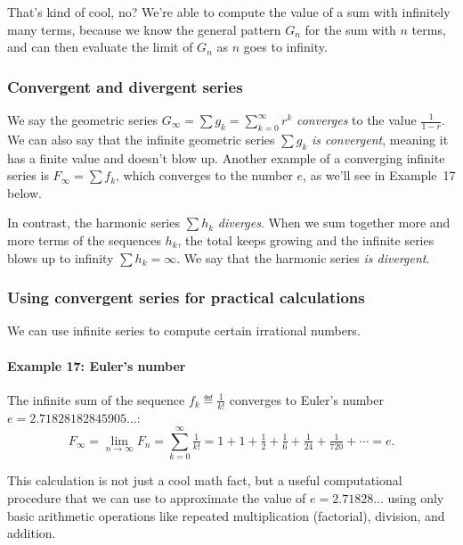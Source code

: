 		\noindent
		That's kind of cool, no?
		We're able to compute the value of a sum with infinitely many terms,
		because we know the general pattern $G_n$ for the sum with $n$ terms,
		and can then evaluate the limit of $G_n$ as $n$ goes to infinity.


		\subsubsection{Convergent and divergent series}
	
			We say the geometric series $G_\infty = \sum g_k = \sum_{k=0}^\infty r^k$ \emph{converges}
			to the value $\frac{1}{1-r}$.
			We can also say that the infinite geometric series $\sum g_k$ \emph{is convergent},
			meaning it has a finite value and doesn't blow up.
			Another example of a converging infinite series is $F_\infty = \sum f_k$,
			which converges to the number $e$,
			as we'll see in Example~17 below.
	
			In contrast,
			the harmonic series $\sum h_k$ \emph{diverges}.
			When we sum together more and more terms of the sequences $h_k$,
			the total keeps growing and the infinite series blows up to infinity
			$\sum h_k = \infty$.
			We say that the harmonic series \emph{is divergent}.




		\subsubsection{Using convergent series for practical calculations}
	
			We can use infinite series to compute certain irrational numbers.
	
			\paragraph{Example 17: Euler's number}
	
				The infinite sum of the sequence $f_k \eqdef \tfrac{1}{k!}$
				converges to Euler's number $e = 2.71828182845905\ldots$:
				\[
					F_\infty 
						= \lim_{n \to \infty} F_n 
						= \sum_{k=0}^\infty \tfrac{1}{k!}
						= 1 + 1 + \tfrac{1}{2} + \tfrac{1}{6} + \tfrac{1}{24} + \tfrac{1}{720} + \cdots
						= e.
				\]
	
			\noindent
			This calculation is not just a cool math fact,
			but a useful computational procedure
			that we can use to approximate the value of $e = 2.71828\ldots$
			using only basic arithmetic operations like repeated multiplication (factorial), division, and addition.
	
